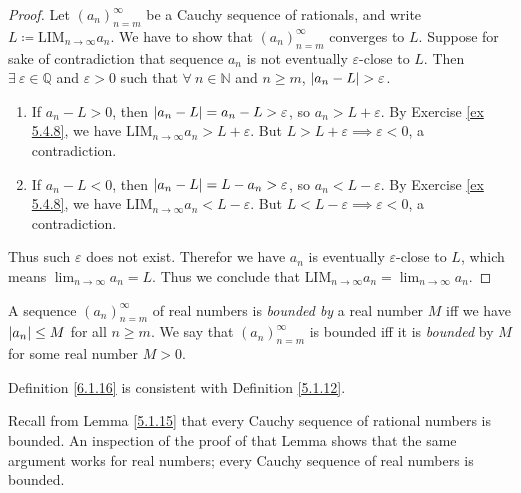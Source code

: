\begin{proof}
Let \((a_n)_{n = m}^\infty\) be a Cauchy sequence of rationals, and write \(L \coloneqq \text{LIM}_{n \to \infty} a_n\).
We have to show that \((a_n)_{n = m}^\infty\) converges to \(L\).
Suppose for sake of contradiction that sequence \(a_n\) is not eventually \(\varepsilon\)-close to \(L\).
Then \(\exists\ \varepsilon \in \mathds{Q}\) and \(\varepsilon > 0\) such that \(\forall\ n \in \mathds{N}\) and \(n \geq m\), \(\abs*{a_n - L} > \varepsilon\).
\begin{enumerate}
    \item If \(a_n - L > 0\), then \(\abs*{a_n - L} = a_n - L > \varepsilon\), so \(a_n > L + \varepsilon\).
    By Exercise \ref{ex 5.4.8}, we have \(\text{LIM}_{n \to \infty} a_n > L + \varepsilon\).
    But \(L > L + \varepsilon \implies \varepsilon < 0\), a contradiction.
    \item If \(a_n - L < 0\), then \(\abs*{a_n - L} = L - a_n > \varepsilon\), so \(a_n < L - \varepsilon\).
    By Exercise \ref{ex 5.4.8}, we have \(\text{LIM}_{n \to \infty} a_n < L - \varepsilon\).
    But \(L < L - \varepsilon \implies \varepsilon < 0\), a contradiction.
\end{enumerate}
Thus such \(\varepsilon\) does not exist.
Therefor we have \(a_n\) is eventually \(\varepsilon\)-close to \(L\), which means \(\lim_{n \to \infty} a_n = L\).
Thus we conclude that \(\text{LIM}_{n \to \infty} a_n = \lim_{n \to \infty} a_n\).
\end{proof}

\begin{definition}\label{6.1.16}
A sequence \((a_n)_{n = m}^\infty\) of real numbers is \emph{bounded by} a real number \(M\) iff we have \(\abs*{a_n} \leq M\) for all \(n \geq m\).
We say that \((a_n)_{n = m}^\infty\) is bounded iff it is \emph{bounded} by \(M\) for some real number \(M > 0\).
\end{definition}

\begin{note}
Definition \ref{6.1.16} is consistent with Definition \ref{5.1.12}.
\end{note}

\begin{note}
Recall from Lemma \ref{5.1.15} that every Cauchy sequence of rational numbers is bounded.
An inspection of the proof of that Lemma shows that the same argument works for real numbers;
every Cauchy sequence of real numbers is bounded.
\end{note}

